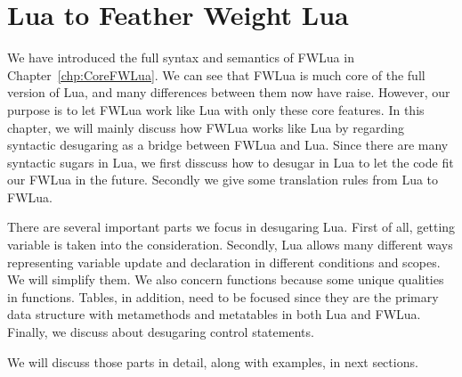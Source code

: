 \newcommand{\desugar}[2]{{#1} & \xlongequal[]{def} & {\begin{array}{@{}l@{}} #2 \end{array}}\\}
\newcommand{\desugarline}[1]{ & & {\begin{array}{@{}l@{}} #1 \end{array}}\\}

\newcommand{\translate}[2]{\llbracket {#1} \rrbracket & \xlongequal[]{} & {\begin{array}{@{}l@{}} #2 \end{array}}\\}
\newcommand{\translateline}[1]{ &  & {\begin{array}{@{}l@{}} #1 \end{array}}\\}

\chapter{Lua to Feather Weight Lua}
\label{chp:luaTranslation}

We have introduced the full syntax and semantics of FWLua in Chapter~\ref{chp:CoreFWLua}. We can see that FWLua is much core of the full version of Lua, and many differences between them now have raise.
However, our purpose is to let FWLua work like Lua with only these core features.
In this chapter, we will mainly discuss how FWLua works like Lua by regarding syntactic desugaring as a bridge between FWLua and Lua. Since there are many syntactic sugars in Lua, we first disscuss how to desugar in Lua to let the code fit our FWLua in the future. Secondly we give some translation rules from Lua to FWLua.

There are several important parts we focus in desugaring Lua. First of all, getting variable is taken into the consideration. Secondly, Lua allows many different ways representing variable update and declaration in different conditions and scopes. We will simplify them. We also concern functions because some unique qualities in functions. Tables, in addition, need to be focused since they are the primary data structure with metamethods and metatables in both Lua and FWLua. Finally, we discuss about desugaring control statements. 

We will discuss those parts in detail, along with examples, in next sections.

